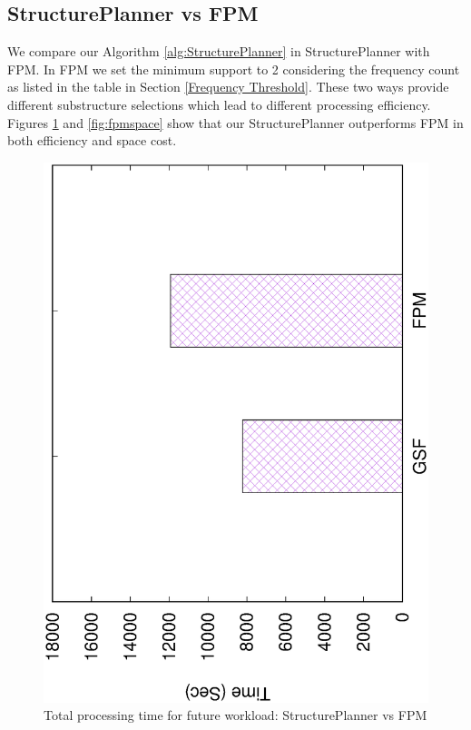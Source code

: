 \subsection{StructurePlanner vs FPM}
\label{StructurePlanner vs FPM}
We compare our Algorithm \ref{alg:StructurePlanner} in StructurePlanner with FPM. In FPM we set the minimum support to 2 considering the frequency count as listed in the table in Section \ref{Frequency Threshold}. These two ways provide different substructure selections which lead to different processing efficiency. Figures \ref{fig:fpmtotal} and \ref{fig:fpmspace} show that our StructurePlanner outperforms FPM in both efficiency and space cost.

\begin{figure}[H]
	\centering
	\includegraphics[scale=0.43, angle=270]{plot/fpm.eps}
	\caption{Total processing time for future workload: StructurePlanner vs FPM}
	\label{fig:fpmtotal}
\end{figure}

